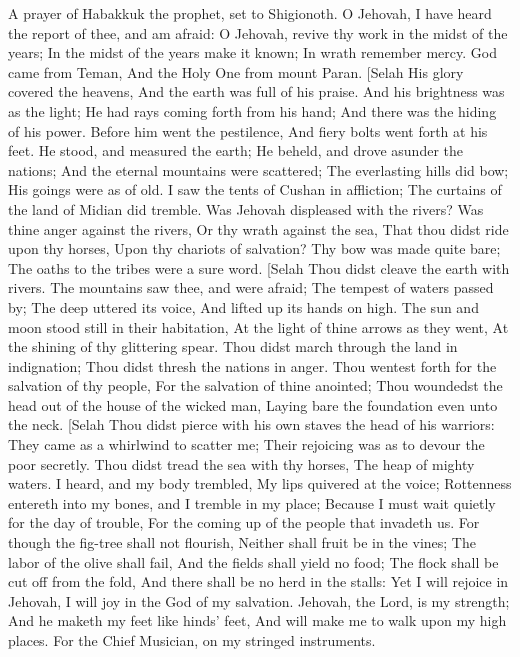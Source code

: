 A prayer of Habakkuk the prophet, set to Shigionoth.  O Jehovah, I have heard the report of thee, and am afraid: O Jehovah, revive thy work in the midst of the years; In the midst of the years make it known; In wrath remember mercy.  God came from Teman, And the Holy One from mount Paran. [Selah His glory covered the heavens, And the earth was full of his praise.  And his brightness was as the light; He had rays coming forth from his hand; And there was the hiding of his power.  Before him went the pestilence, And fiery bolts went forth at his feet.  He stood, and measured the earth; He beheld, and drove asunder the nations; And the eternal mountains were scattered; The everlasting hills did bow; His goings were as of old.  I saw the tents of Cushan in affliction; The curtains of the land of Midian did tremble.  Was Jehovah displeased with the rivers? Was thine anger against the rivers, Or thy wrath against the sea, That thou didst ride upon thy horses, Upon thy chariots of salvation?  Thy bow was made quite bare; The oaths to the tribes were a sure word. [Selah Thou didst cleave the earth with rivers.  The mountains saw thee, and were afraid; The tempest of waters passed by; The deep uttered its voice, And lifted up its hands on high.  The sun and moon stood still in their habitation, At the light of thine arrows as they went, At the shining of thy glittering spear.  Thou didst march through the land in indignation; Thou didst thresh the nations in anger.  Thou wentest forth for the salvation of thy people, For the salvation of thine anointed; Thou woundedst the head out of the house of the wicked man, Laying bare the foundation even unto the neck. [Selah  Thou didst pierce with his own staves the head of his warriors: They came as a whirlwind to scatter me; Their rejoicing was as to devour the poor secretly.  Thou didst tread the sea with thy horses, The heap of mighty waters.  I heard, and my body trembled, My lips quivered at the voice; Rottenness entereth into my bones, and I tremble in my place; Because I must wait quietly for the day of trouble, For the coming up of the people that invadeth us.  For though the fig-tree shall not flourish, Neither shall fruit be in the vines; The labor of the olive shall fail, And the fields shall yield no food; The flock shall be cut off from the fold, And there shall be no herd in the stalls:  Yet I will rejoice in Jehovah, I will joy in the God of my salvation.  Jehovah, the Lord, is my strength; And he maketh my feet like hinds’ feet, And will make me to walk upon my high places. For the Chief Musician, on my stringed instruments. 